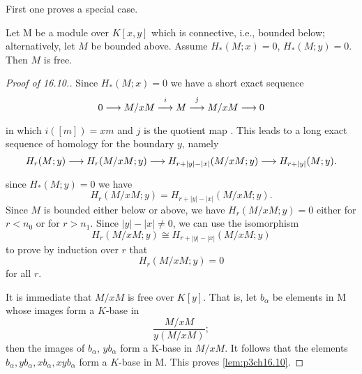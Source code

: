 \documentclass[../main]{subfiles}
\begin{document}
First one proves a special case.
\begin{lemma}\label{lem:p3ch16.10} 
Let M be a module over $K[x, y]$ which is connective, i.e., bounded below; alternatively, let $M$ be bounded above. Assume $H_{\ast}(M;x)=0$, $ H_{\ast}(M;y)=0$. Then $M$ is free.
    
\end{lemma}
\begin{proof}[Proof of 16.10.] Since $H_{\ast}(M;x)=0$ we have a short exact sequence \begin{equation*}
    0 \lar{} M/xM \overset{i}{\lar{}} M \overset{j}{\lar{}} M/xM \lar{} 0 
\end{equation*}
in which $i([m])=xm$ and $j$ is the quotient map . This leads to a long exact sequence of homology for the boundary $y$, namely \begin{equation*}
    H_{r}(M;y) \lar{} H_{r}(M/xM;y) \lar{} H_{r+|y|-|x|}(M/xM;y)\lar{} H_{r+|y|}(M;y).
\end{equation*}
since $H_{\ast}(M;y)=0$ we have \begin{equation*}
    H_{r}(M/xM;y)=H_{r+|y|-|x|}(M/xM;y).
\end{equation*}
Since $M$ is bounded either below or above, we have $H_{r}(M/xM;y)=0$ either for $r<n_{0}$ or for $r>n_{1}$. Since $|y|-|x| \neq 0$, we can use the isomorphism \begin{equation*}
    H_{r}(M/xM;y) \cong H_{r+|y|-|x|}(M/xM;y)
\end{equation*} 
to prove by induction over $r$ that \begin{equation*}
     H_{r}(M/xM;y)=0
\end{equation*}
for all $r$. 

It is immediate that $M/xM$ is free over $K[y]$. That is, let $b_{\alpha}$ be elements in M whose images form a $K$-base in \begin{equation*}
    \frac{M/xM}{y(M/xM)};
\end{equation*}
then the images of $b_{\alpha}$, $yb_{\alpha}$ form a K-base in $M/xM$. It follows that the elements $b_{\alpha}, yb_{\alpha}, xb_{\alpha}, xyb_{\alpha}$ form a $K$-base in M. This proves \ref{lem:p3ch16.10}.
\end{proof}
\end{document}
